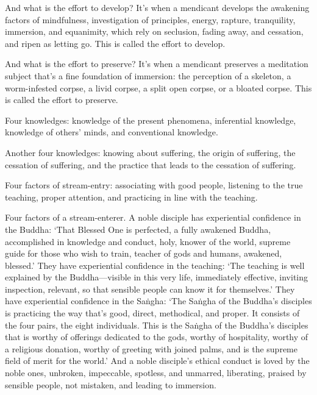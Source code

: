 \documentclass[12pt,openany]{book}%
\begin{document}
And what is the effort to develop? It’s when a mendicant develops the awakening factors of mindfulness, investigation of principles, energy, rapture, tranquility, immersion, and equanimity, which rely on seclusion, fading away, and cessation, and ripen as letting go. This is called the effort to develop. 

And what is the effort to preserve? It’s when a mendicant preserves a meditation subject that’s a fine foundation of immersion: the perception of a skeleton, a worm-infested corpse, a livid corpse, a split open corpse, or a bloated corpse. This is called the effort to preserve. 

Four knowledges: knowledge of the present phenomena, inferential knowledge, knowledge of others’ minds, and conventional knowledge. 

Another four knowledges: knowing about suffering, the origin of suffering, the cessation of suffering, and the practice that leads to the cessation of suffering. 

Four factors of stream-entry: associating with good people, listening to the true teaching, proper attention, and practicing in line with the teaching. 

Four factors of a stream-enterer. A noble disciple has experiential confidence in the Buddha: ‘That Blessed One is perfected, a fully awakened Buddha, accomplished in knowledge and conduct, holy, knower of the world, supreme guide for those who wish to train, teacher of gods and humans, awakened, blessed.’ They have experiential confidence in the teaching: ‘The teaching is well explained by the Buddha—visible in this very life, immediately effective, inviting inspection, relevant, so that sensible people can know it for themselves.’ They have experiential confidence in the \textsanskrit{Saṅgha}: ‘The \textsanskrit{Saṅgha} of the Buddha’s disciples is practicing the way that’s good, direct, methodical, and proper. It consists of the four pairs, the eight individuals. This is the \textsanskrit{Saṅgha} of the Buddha’s disciples that is worthy of offerings dedicated to the gods, worthy of hospitality, worthy of a religious donation, worthy of greeting with joined palms, and is the supreme field of merit for the world.’ And a noble disciple’s ethical conduct is loved by the noble ones, unbroken, impeccable, spotless, and unmarred, liberating, praised by sensible people, not mistaken, and leading to immersion. 
\end{document}

